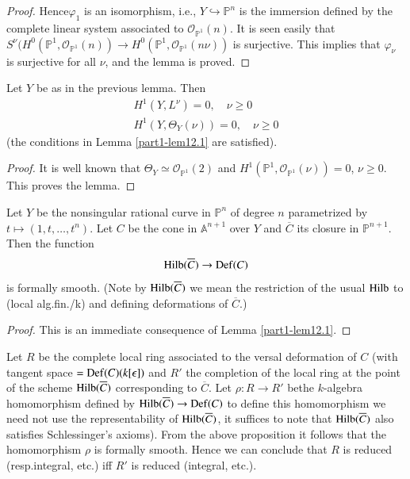 {\begin{proof}
Hence\pageoriginale $\varphi_{1}$ is an isomorphism, i.e.,
$Y\hookrightarrow \mathbb{P}^{n}$ is the immersion defined by the
complete linear system associated to
$\mathscr{O}_{\mathbb{P}^{1}}(n)$. It is seen easily that
$S^{\nu}(H^{0}(\mathbb{P}^{1},\mathscr{O}_{\mathbb{P}^{1}}(n))\to
H^{0}(\mathbb{P}^{1},\mathscr{O}_{\mathbb{P}^{1}}(n\nu))$ is
surjective. This implies that $\varphi_{\nu}$ is surjective for all
$\nu$, and the lemma is proved.
\end{proof}

\begin{lemma}\label{part1-lem13.4}
Let $Y$ be as in the previous lemma. Then
\begin{gather*}
H^{1}(Y,L^{\nu})=0,\quad \nu\geq 0\\
H^{1}(Y,\Theta_{Y}(\nu))=0,\quad \nu\geq 0
\end{gather*}
(the conditions in Lemma \ref{part1-lem12.1} are satisfied).
\end{lemma}

\begin{proof}
It is well known that $\Theta_{Y}\simeq
\mathscr{O}_{\mathbb{P}^{1}}(2)$ and
$H^{1}(\mathbb{P}^{1},\mathscr{O}_{\mathbb{P}^{1}}(\nu))=0$, $\nu\geq
0$. This proves the lemma.
\end{proof}

\begin{proposition}\label{part1-prop13.1}
Let $Y$ be the nonsingular rational curve in $\mathbb{P}^{n}$ of
degree $n$ parametrized by $t\mapsto (1,t,\ldots,t^{n})$. Let $C$ be
the cone in $\mathbb{A}^{n+1}$ over $Y$ and $\overline{C}$ its closure
in $\mathbb{P}^{n+1}$. Then the function
$$
\operatorname{Hilb}(\overline{C})\to \operatorname{Def}(C)
$$
is formally smooth. (Note by $\operatorname{Hilb}(\overline{C})$ we mean the
restriction of the usual $\operatorname{Hilb}$ to (local alg.\@ fin./k) and defining
deformations of $\overline{C}$.)
\end{proposition}

\begin{proof}
This is an immediate consequence of Lemma \ref{part1-lem12.1}.
\end{proof}

Let $R$ be the complete local ring associated to the versal
deformation of $C$ (with tangent space $=\operatorname{Def}(C)(k[\epsilon])$ and
$R'$ the completion of the local ring at the point of the scheme
$\operatorname{Hilb}(\overline{C})$ corresponding to $\overline{C}$. Let $\rho:R\to
R'$ be\pageoriginale the $k$-algebra homomorphism defined by
$\operatorname{Hilb}(\overline{C})\to \operatorname{Def}(C)$ to define this homomorphism we need
not use the representability of $\operatorname{Hilb}(\overline{C})$, it suffices to
note that $\operatorname{Hilb}(\overline{C})$ also satisfies Schlessinger's
axioms). From the above proposition it follows that the homomorphism
$\rho$ is formally smooth. Hence we can conclude that $R$ is reduced
(resp.\@ integral, etc.) iff $R'$ is reduced (integral, etc.).

}
